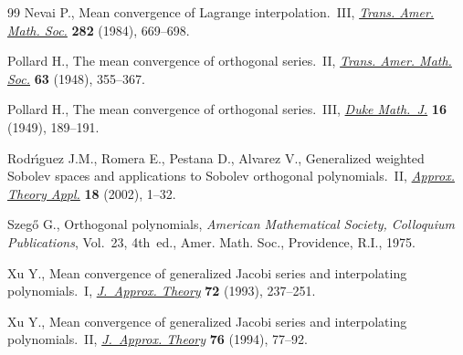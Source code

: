 \documentclass[pdftex]{sigma}
\numberwithin{equation}{section}
\begin{document}
\begin{thebibliography}{99}
Nevai P., Mean convergence of {L}agrange interpolation.~{III}, \href{https://doi.org/10.2307/1999259}{\textit{Trans.
 Amer. Math. Soc.}} \textbf{282} (1984), 669--698.

Pollard H., The mean convergence of orthogonal series.~{II}, \href{https://doi.org/10.2307/1990435}{\textit{Trans.
 Amer. Math. Soc.}} \textbf{63} (1948), 355--367.

Pollard H., The mean convergence of orthogonal series.~{III}, \href{https://doi.org/10.1215/S0012-7094-49-01619-1}{\textit{Duke
 Math.~J.}} \textbf{16} (1949), 189--191.

Rodr\'{\i}guez J.M., Romera E., Pestana D., Alvarez V., Generalized weighted
 {S}obolev spaces and applications to {S}obolev orthogonal polynomials.~{II},
 \href{https://doi.org/10.1007/BF02837397}{\textit{Approx. Theory Appl.}} \textbf{18} (2002), 1--32.

Szeg\H{o} G., Orthogonal polynomials, \textit{American Mathematical Society,
 Colloquium Publications}, Vol.~23, 4th~ed., Amer. Math. Soc., Providence, R.I., 1975.

Xu Y., Mean convergence of generalized {J}acobi series and interpolating
 polynomials.~{I}, \href{https://doi.org/10.1006/jath.1993.1019}{\textit{J.~Approx. Theory}} \textbf{72} (1993), 237--251.

Xu Y., Mean convergence of generalized {J}acobi series and interpolating
 polynomials.~{II}, \href{https://doi.org/10.1006/jath.1994.1006}{\textit{J.~Approx. Theory}} \textbf{76} (1994), 77--92.

\end{thebibliography}\LastPageEnding
\end{document}
